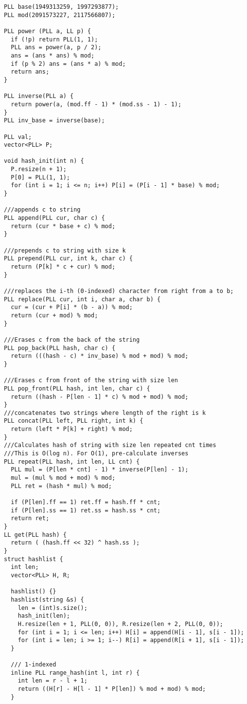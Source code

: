 \documentclass[FSZ,a4paper,onesided]{article}
\begin{document}
\begin{multicols*}{\COLS}
\begin{lstlisting}
PLL base(1949313259, 1997293877);
PLL mod(2091573227, 2117566807);

PLL power (PLL a, LL p) {
  if (!p) return PLL(1, 1);
  PLL ans = power(a, p / 2);
  ans = (ans * ans) % mod;
  if (p % 2) ans = (ans * a) % mod;
  return ans;
}

PLL inverse(PLL a) {
  return power(a, (mod.ff - 1) * (mod.ss - 1) - 1);
}
PLL inv_base = inverse(base);

PLL val;
vector<PLL> P;

void hash_init(int n) {
  P.resize(n + 1);
  P[0] = PLL(1, 1);
  for (int i = 1; i <= n; i++) P[i] = (P[i - 1] * base) % mod;
}

///appends c to string
PLL append(PLL cur, char c) {
  return (cur * base + c) % mod;
}

///prepends c to string with size k
PLL prepend(PLL cur, int k, char c) {
  return (P[k] * c + cur) % mod;
}

///replaces the i-th (0-indexed) character from right from a to b;
PLL replace(PLL cur, int i, char a, char b) {
  cur = (cur + P[i] * (b - a)) % mod;
  return (cur + mod) % mod;
}

///Erases c from the back of the string
PLL pop_back(PLL hash, char c) {
  return (((hash - c) * inv_base) % mod + mod) % mod;
}

///Erases c from front of the string with size len
PLL pop_front(PLL hash, int len, char c) {
  return ((hash - P[len - 1] * c) % mod + mod) % mod;
}
///concatenates two strings where length of the right is k
PLL concat(PLL left, PLL right, int k) {
  return (left * P[k] + right) % mod;
}
///Calculates hash of string with size len repeated cnt times
///This is O(log n). For O(1), pre-calculate inverses
PLL repeat(PLL hash, int len, LL cnt) {
  PLL mul = (P[len * cnt] - 1) * inverse(P[len] - 1);
  mul = (mul % mod + mod) % mod;
  PLL ret = (hash * mul) % mod;

  if (P[len].ff == 1) ret.ff = hash.ff * cnt;
  if (P[len].ss == 1) ret.ss = hash.ss * cnt;
  return ret;
}
LL get(PLL hash) {
  return ( (hash.ff << 32) ^ hash.ss );
}
struct hashlist {
  int len;
  vector<PLL> H, R;

  hashlist() {}
  hashlist(string &s) {
    len = (int)s.size();
    hash_init(len);
    H.resize(len + 1, PLL(0, 0)), R.resize(len + 2, PLL(0, 0));
    for (int i = 1; i <= len; i++) H[i] = append(H[i - 1], s[i - 1]);
    for (int i = len; i >= 1; i--) R[i] = append(R[i + 1], s[i - 1]);
  }
  
  /// 1-indexed
  inline PLL range_hash(int l, int r) {
    int len = r - l + 1;
    return ((H[r] - H[l - 1] * P[len]) % mod + mod) % mod;
  }


\end{lstlisting}
\end{multicols*}
\end{document}
